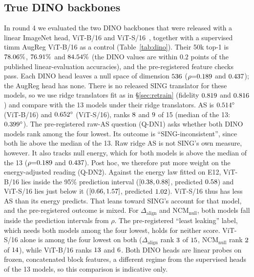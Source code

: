 \documentclass[10pt]{article}
\begin{document}
\subsection{True DINO backbones}
\label{app:truedino}
In round 4 we evaluated the two DINO backbones that were released with a linear ImageNet head, ViT-B/16 and ViT-S/16~\citep{dino2021}, together with a supervised timm AugReg ViT-B/16 as a control (Table~\ref{tab:dino}).
Their 50k top-1 is $78.06\%$, $76.91\%$ and $84.54\%$ (the DINO values are within $0.2$ points of the published linear-evaluation accuracies), and the pre-registered feature checks pass.
Each DINO head leaves a null space of dimension $536$ ($\rho{=}0.189$ and $0.437$); the AugReg head has none.
There is no released SING translator for these models, so we use ridge translators fit as in \S\ref{sec:retrain} (fidelity $0.819$ and $0.816$) and compare with the 13 models under their ridge translators.
AS is $0.514^\circ$ (ViT-B/16) and $0.652^\circ$ (ViT-S/16), ranks $8$ and $9$ of 15 (median of the 13: $0.399^\circ$).
The pre-registered raw-AS question (Q-DN1) asks whether both DINO models rank among the four lowest. Its outcome is ``SING-inconsistent'', since both lie above the median of the 13.
Raw ridge AS is not SING's own measure, however. It also tracks null energy, which for both models is above the median of the 13 ($\rho{=}0.189$ and $0.437$). Post hoc, we therefore put more weight on the energy-adjusted reading (Q-DN2).
Against the energy law fitted on E12, ViT-B/16 lies inside the 95\% prediction interval ($[0.38,0.88]$, predicted $0.58$) and ViT-S/16 lies just below it ($[0.66,1.57]$, predicted $1.02$). ViT-S/16 thus has less AS than its energy predicts. That leans toward SING's account for that model, and the pre-registered outcome is mixed.
For $\Delta_{\mathrm{align}}$ and NCM$_{\mathrm{null}}$, both models fall inside the prediction intervals from $\rho$. The pre-registered ``least leaking'' label, which needs both models among the four lowest, holds for neither score. ViT-S/16 alone is among the four lowest on both ($\Delta_{\mathrm{align}}$ rank $3$ of $15$, NCM$_{\mathrm{null}}$ rank $2$ of $14$), while ViT-B/16 ranks $13$ and $6$.
Both DINO heads are linear probes on frozen, concatenated block features, a different regime from the supervised heads of the 13 models, so this comparison is indicative only.

\begin{table}[t]
\centering\footnotesize
\resizebox{\linewidth}{!}{}
\caption{True DINO backbones with their released linear heads (\S\ref{sec:dino}), ridge translators on the test half. Rank among 15 models (1 $=$ least leakage); prediction interval from the E12 energy law $\log\mathrm{AS}\sim\log\rho$. AugReg ViT-B/16: supervised control with an empty null space.}
\label{tab:dino}
\end{table}
\end{document}

